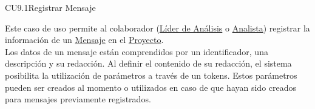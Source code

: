	\begin{UseCase}{CU9.1}{Registrar Mensaje}{
			
			Este caso de uso permite al colaborador (\hyperlink{jefe}{Líder de Análisis} o \hyperlink{analista}{Analista}) registrar la información de un \hyperlink{MSGEntidad}{Mensaje} en el \hyperlink{proyectoEntidad}{Proyecto}.\\
			
			Los datos de un mensaje están comprendidos por un identificador, una descripción y su redacción. Al definir el contenido de su redacción, el sistema posibilita la utilización de parámetros a través de un tokens. Estos parámetros pueden ser creados al momento o utilizados en caso de que hayan sido creados para mensajes previamente registrados.\\
			
}
\end{UseCase}
